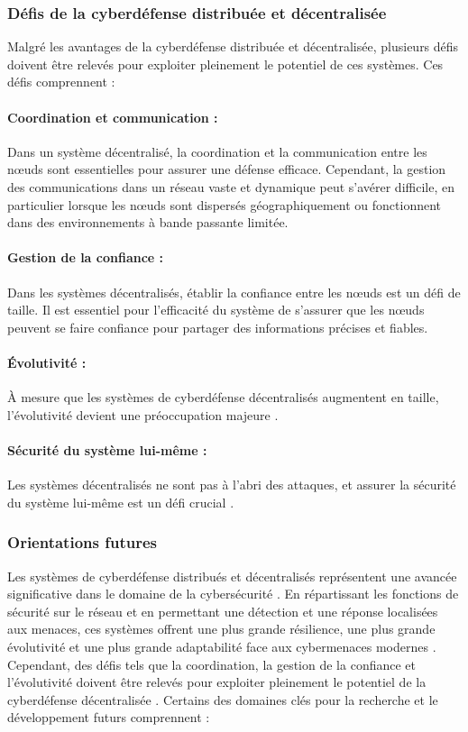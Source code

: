 \subsubsection{Défis de la cyberdéfense distribuée et décentralisée}

Malgré les avantages de la cyberdéfense distribuée et décentralisée, plusieurs défis doivent être relevés pour exploiter pleinement le potentiel de ces systèmes. Ces défis comprennent :

\paragraph{Coordination et communication :}
Dans un système décentralisé, la coordination et la communication entre les nœuds sont essentielles pour assurer une défense efficace. Cependant, la gestion des communications dans un réseau vaste et dynamique peut s'avérer difficile, en particulier lorsque les nœuds sont dispersés géographiquement ou fonctionnent dans des environnements à bande passante limitée.

\paragraph{Gestion de la confiance :}
Dans les systèmes décentralisés, établir la confiance entre les nœuds est un défi de taille. Il est essentiel pour l'efficacité du système de s'assurer que les nœuds peuvent se faire confiance pour partager des informations précises et fiables.

\paragraph{Évolutivité :}
À mesure que les systèmes de cyberdéfense décentralisés augmentent en taille, l'évolutivité devient une préoccupation majeure \cite{Bera2017}.

\paragraph{Sécurité du système lui-même :}
Les systèmes décentralisés ne sont pas à l’abri des attaques, et assurer la sécurité du système lui-même est un défi crucial \cite{Roman2013}.

\subsubsection{Orientations futures}

Les systèmes de cyberdéfense distribués et décentralisés représentent une avancée significative dans le domaine de la cybersécurité \cite{Christidis2016}. En répartissant les fonctions de sécurité sur le réseau et en permettant une détection et une réponse localisées aux menaces, ces systèmes offrent une plus grande résilience, une plus grande évolutivité et une plus grande adaptabilité face aux cybermenaces modernes \cite{Roman2013}. Cependant, des défis tels que la coordination, la gestion de la confiance et l'évolutivité doivent être relevés pour exploiter pleinement le potentiel de la cyberdéfense décentralisée \cite{Xu2019}.
Certains des domaines clés pour la recherche et le développement futurs comprennent :

